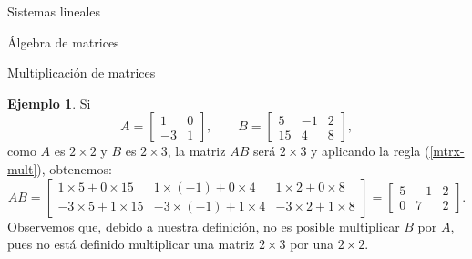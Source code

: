 \documentclass[a4paper,12pt,twoside,spanish,reqno]{amsbook}
\theoremstyle{definition}
\newtheorem{ejemplo}{Ejemplo}[section]
\theoremstyle{remark}
\begin{document}
\begin{chapter}{Sistemas lineales}
\begin{section}{Álgebra de matrices}
\begin{subsection}{Multiplicación de matrices}
                \begin{ejemplo}
                    Si 
                    \begin{equation*}
                        A = \begin{bmatrix}1&0\\-3&1\end{bmatrix}, \qquad B = \begin{bmatrix}5&-1&2\\15&4&8\end{bmatrix},
                    \end{equation*}
                    como $A$ es $2 \times 2$ y $B$ es $2 \times 3$, la matriz $AB$ será $2 \times 3$ y  aplicando la regla (\ref{mtrx-mult}), obtenemos:
                    \begin{equation*}
                        AB = \begin{bmatrix}1\times  5 + 0\times 15&1\times (-1) + 0\times 4&1\times 2 + 0\times 8
                            \\-3\times 5 + 1\times 15&-3\times (-1) + 1\times 4&-3\times 2 + 1\times 8
                        \end{bmatrix} =
                        \begin{bmatrix} 5 &-1 &2 
                            \\ 0 &7 &2
                        \end{bmatrix}.
                    \end{equation*}
                    Observemos que, debido a nuestra definición, no es posible multiplicar $B$ por $A$, pues no está definido multiplicar una matriz $2 \times 3$ por una $2 \times 2$.
                \end{ejemplo}
                     

\end{subsection}
\end{section}
\end{chapter}
\end{document}
